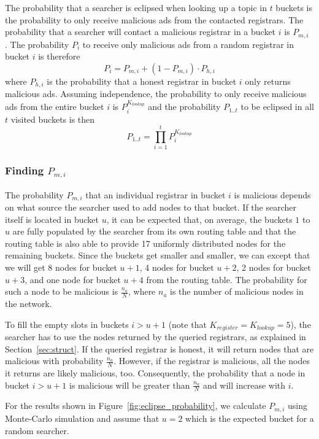 The probability that a searcher is eclipsed when looking up a topic in $t$ buckets is the probability to only receive malicious ads from the contacted registrars. The probability that a searcher will contact a malicious registrar in a bucket $i$ is $P_{m,i}$ .
The probability $P_i$ to receive only malicious ads from a random registrar in bucket $i$ is therefore
$$ P_{i} = P_{m,i} + (1-P_{m,i}) \cdot P_{h,i}$$
where $P_{h,i}$ is the probability that a honest registrar in bucket $i$ only returns malicious ads.
Assuming independence, the probability to only receive malicious ads from the entire bucket $i$ is $P_{i}^{K_\textit{lookup}}$ and the probability $P_{1..t}$ to be eclipsed in all $t$ visited buckets is then
$$ P_{1..t} = \prod_{i=1}^{t} P_{i}^{K_\textit{lookup}}$$

\subsubsection{Finding $P_{m,i}$}

The probability $P_{m,i}$ that an individual registrar in bucket $i$ is malicious depends on what source the searcher used to add nodes to that bucket.
If the searcher itself is located in bucket $u$, it can be expected that, on average, the buckets $1$ to $u$ are fully populated by the searcher from its own routing table and that the routing table is also able to provide 17 uniformly distributed nodes for the remaining buckets. Since the buckets get smaller and smaller, we can except that we will get 8 nodes for bucket $u+1$, 4 nodes for bucket $u+2$, 2 nodes for bucket $u+3$, and one node for bucket $u+4$ from the routing table.
The probability for such a node to be malicious is $\frac{n_a}{N}$, where $n_a$ is the number of malicious nodes in the network.

To fill the empty slots in buckets $i>u+1$ (note that $K_\textit{register}=K_\textit{lookup}=5$), the searcher has to use the nodes returned by the queried registrars, as explained in Section~\ref{sec:struct}. If the queried registrar is honest, it will return nodes that are malicious with probability $\frac{n_a}{N}$. However, if the registrar is malicious, all the nodes it returns are likely malicious, too. Consequently, the probability that a node in bucket $i>u+1$ is malicious will be greater than $\frac{n_a}{N}$ and will increase with $i$.

For the results shown in Figure~\ref{fig:eclipse_probability}, we calculate $P_{m,i}$ using Monte-Carlo simulation and assume that $u=2$ which is the expected bucket for a random searcher.


